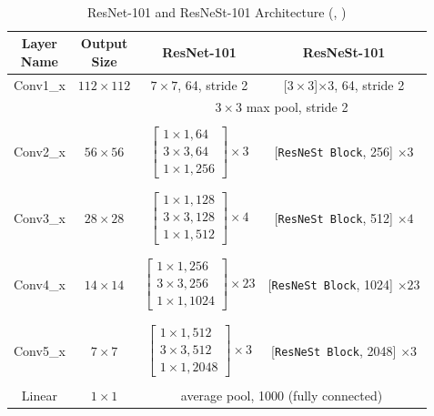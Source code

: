 \documentclass [MAS] {uclathes}
\begin{document}
\

\begin{table}[h!]
\centering
\footnotesize 
\renewcommand{\arraystretch}{0.7}
\begin{tabular}{ c | c | c | c } 
\hline
\makecell{\textbf{Layer} \\ \textbf{Name}} & \makecell{\textbf{Output} \\ \textbf{Size}} & \textbf{ResNet-101} & \textbf{ResNeSt-101}\\ 
\hline
\hline
Conv1\_x & $112 \times 112$ & $7 \times 7$, 64, stride 2 & [$3\times 3$]$\times 3$, 64, stride 2\\
\hline
 &  & \multicolumn{2}{c}{$3 \times 3$ max pool, stride 2}\\
\hline
&  & & \\
Conv2\_x & $56 \times 56$ & $\begin{bmatrix} 1 \times 1, 64  \\ 3 \times 3, 64 \\ 1 \times 1, 256 \end{bmatrix} \times 3$ & [\texttt{ResNeSt Block}, 256] $\times 3$\\
&  & & \\
\hline
&  & & \\
Conv3\_x & $28 \times 28$ & $\begin{bmatrix} 1 \times 1, 128  \\ 3 \times 3, 128 \\ 1 \times 1, 512 \end{bmatrix} \times 4$ & [\texttt{ResNeSt Block}, 512] $\times 4$\\
&  & & \\
\hline
&  & & \\
Conv4\_x & $14 \times 14$ & $\begin{bmatrix} 1 \times 1, 256  \\ 3 \times 3, 256 \\ 1 \times 1, 1024 \end{bmatrix} \times 23$ & [\texttt{ResNeSt Block}, 1024] $\times 23$\\
&  & & \\
\hline
&  & & \\
Conv5\_x & $7 \times 7$ & $\begin{bmatrix} 1 \times 1, 512  \\ 3 \times 3, 512 \\ 1 \times 1, 2048 \end{bmatrix} \times 3$ & [\texttt{ResNeSt Block}, 2048] $\times 3$\\
&  & & \\
\hline
Linear & $1 \times 1$ & \multicolumn{2}{c}{average pool, 1000 (fully connected)}\\
\hline  
\end{tabular}
\label{tab:resnet_resnest_archs}
\caption{ResNet-101 and ResNeSt-101 Architecture (\cite{resnet}, \cite{resnest})}
\end{table}
\end{document}
